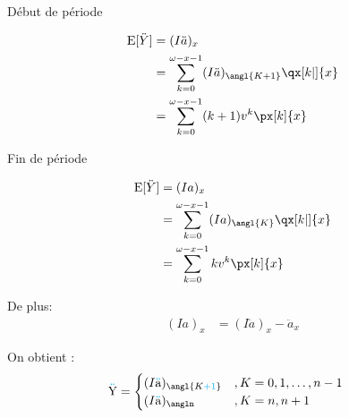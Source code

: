 \documentclass[10pt, french]{article}
\newcommand\cumlaut[2][black]{\stackon[.33ex]{#2}{\textcolor{#1}{\kern-.04ex.\kern-.2ex.}}}
\begin{document}
\begin{multicols*}{3}
\setlength{\mathindent}{-1cm}
\begin{minipage}[t]{0.5\columnwidth}
\begin{center}
Début de période
\end{center}
\begin{align*}
	\text{E}[\ddot{Y}]
	&=	(I\ddot{a})_{x}	\\
	&=	\sum_{k = 0}^{\omega - x - 1} (I\ddot{a})_{\angl{K + 1}} \qx[k|]{x}	\\
	&=	\sum_{k = 0}^{\omega - x - 1} (k + 1) v^{k} \px[k]{x}
\end{align*}
\end{minipage}
\begin{minipage}[t]{0.5\columnwidth}
\begin{center}
Fin de période
\end{center}
\begin{align*}
	\text{E}[\ddot{Y}]
	&=	(Ia)_{x}	\\
	&=	\sum_{k = 0}^{\omega - x - 1} (Ia)_{\angl{K}} \qx[k|]{x}	\\
	&=	\sum_{k = 0}^{\omega - x - 1} k v^{k} \px[k]{x}
\end{align*}
\end{minipage}
\setlength{\mathindent}{1cm}

De plus:
\begin{align*}
	(Ia)_{x}
	&=	(I\ddot{a})_{x}	-	\ddot{a}_{x}
\end{align*}


\begin{definitionNOHFILLprop}
On obtient :
\begin{align*}
	\cumlaut[cyan]{Y}
	&= 	\begin{cases}
			(I\cumlaut[cyan]{a})_{\angl{K \textcolor{cyan}{+ 1}}}	& , K = 0, 1, \dots, n - 1 \\
			(I\cumlaut[cyan]{a})_{\angln}			& , K = n, n + 1 \\
		\end{cases} 	
\end{align*}
\end{definitionNOHFILLprop}



\end{multicols*}
\end{document}
